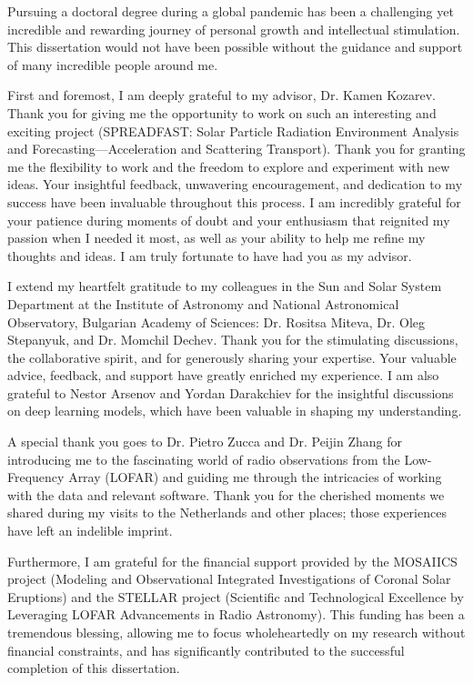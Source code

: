 Pursuing a doctoral degree during a global pandemic has been a challenging yet incredible and rewarding journey of personal growth and intellectual stimulation. This dissertation would not have been possible without the guidance and support of many incredible people around me.

First and foremost, I am deeply grateful to my advisor, Dr. Kamen Kozarev. Thank you for giving me the opportunity to work on such an interesting and exciting project (SPREADFAST: Solar Particle Radiation Environment Analysis and Forecasting—Acceleration and Scattering Transport). Thank you for granting me the flexibility to work and the freedom to explore and experiment with new ideas. Your insightful feedback, unwavering encouragement, and dedication to my success have been invaluable throughout this process. I am incredibly grateful for your patience during moments of doubt and your enthusiasm that reignited my passion when I needed it most, as well as your ability to help me refine my thoughts and ideas. I am truly fortunate to have had you as my advisor.

I extend my heartfelt gratitude to my colleagues in the Sun and Solar System Department at the Institute of Astronomy and National Astronomical Observatory, Bulgarian Academy of Sciences: Dr. Rositsa Miteva, Dr. Oleg Stepanyuk, and Dr. Momchil Dechev. Thank you for the stimulating discussions, the collaborative spirit, and for generously sharing your expertise. Your valuable advice, feedback, and support have greatly enriched my experience. I am also grateful to Nestor Arsenov and Yordan Darakchiev for the insightful discussions on deep learning models, which have been valuable in shaping my understanding.

A special thank you goes to Dr. Pietro Zucca and Dr. Peijin Zhang for introducing me to the fascinating world of radio observations from the Low-Frequency Array (LOFAR) and guiding me through the intricacies of working with the data and relevant software. Thank you for the cherished moments we shared during my visits to the Netherlands and other places; those experiences have left an indelible imprint.

Furthermore, I am grateful for the financial support provided by the MOSAIICS project (Modeling and Observational Integrated Investigations of Coronal Solar Eruptions) and the STELLAR project (Scientific and Technological Excellence by Leveraging LOFAR Advancements in Radio Astronomy). This funding has been a tremendous blessing, allowing me to focus wholeheartedly on my research without financial constraints, and has significantly contributed to the successful completion of this dissertation.

